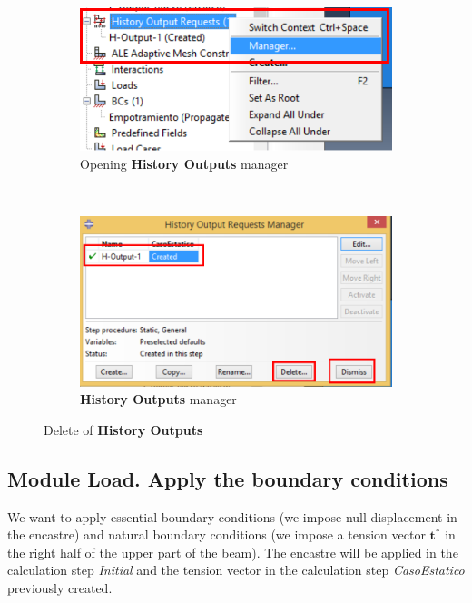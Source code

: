 \begin{enumerate}
  \begin{figure}[H]
    \centering
    \begin{subfigure}{0.45\textwidth}
      \includegraphics[width=\textwidth]{./body/images/imagen41.pdf}
      \caption{Opening \textbf{History Outputs} manager}
      \label{figu41}
    \end{subfigure}%
    ~ %
    \begin{subfigure}{0.45\textwidth}
      \includegraphics[width=\textwidth]{./body/images/imagen42.pdf}
      \caption{\textbf{History Outputs} manager}
      \label{figu42}
    \end{subfigure}%
    \caption{Delete of \textbf{History Outputs}}
  \end{figure}
\end{enumerate}
\newpage
\subsection{Module Load. Apply the boundary conditions}

We want to apply essential boundary conditions (we
impose null displacement in the encastre) and  natural boundary conditions (we
impose a tension vector $ \textbf{t}^*$ in the right half of the  upper
part of the beam).  The encastre will be applied in the calculation
step \textit{Initial} and the tension vector in the calculation step
\textit{CasoEstatico} previously created.

